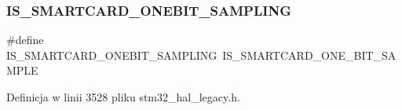 \subsubsection{\texorpdfstring{I\+S\+\_\+\+S\+M\+A\+R\+T\+C\+A\+R\+D\+\_\+\+O\+N\+E\+B\+I\+T\+\_\+\+S\+A\+M\+P\+L\+I\+NG}{IS\_SMARTCARD\_ONEBIT\_SAMPLING}}
{\footnotesize\ttfamily \#define I\+S\+\_\+\+S\+M\+A\+R\+T\+C\+A\+R\+D\+\_\+\+O\+N\+E\+B\+I\+T\+\_\+\+S\+A\+M\+P\+L\+I\+NG~I\+S\+\_\+\+S\+M\+A\+R\+T\+C\+A\+R\+D\+\_\+\+O\+N\+E\+\_\+\+B\+I\+T\+\_\+\+S\+A\+M\+P\+LE}



Definicja w linii 3528 pliku stm32\+\_\+hal\+\_\+legacy.\+h.

